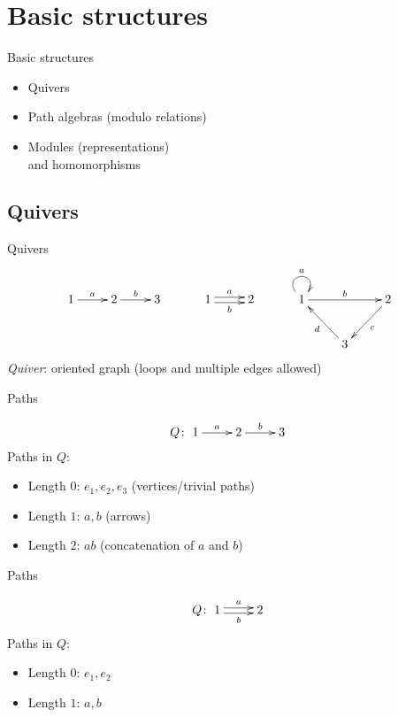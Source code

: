 \documentclass[usenames,dvipsnames]{beamer}
\newcommand{\defn}[1]{\textit{#1}}
\begin{document}
\section{Basic structures}

\begin{frame}{}
\huge Basic structures
\Large
\begin{itemize}
\item Quivers
\item Path algebras (modulo relations)
\item Modules (representations)\\and homomorphisms
\end{itemize}
\end{frame}

\subsection{Quivers}

\begin{frame}{Quivers}
\[
\xymatrix{1\ar[r]^a & 2\ar[r]^b & 3} \qquad\quad
\xymatrix{1\ar@<.5ex>[r]^a\ar@<-.5ex>[r]_b & 2} \qquad\quad
\xymatrix{1\ar@(ul,ur)^a\ar[rr]^b & & 2\ar[dl]^c \\ & 3\ar[ul]^d & }
\]
\pause \defn{Quiver}: oriented graph (loops and multiple edges allowed)
\end{frame}

\begin{frame}{Paths}

{\Large
\[
Q \colon \xymatrix{1\ar[r]^a & 2\ar[r]^b & 3}
\]
}
Paths in $Q$:\pause
\begin{itemize}
\item Length $0$: $e_1, e_2, e_3$ (vertices/trivial paths)
\pause
\item Length $1$: $a, b$ (arrows)
\pause
\item Length $2$: $ab$ (concatenation of $a$ and $b$)
\end{itemize}
\end{frame}

\begin{frame}{Paths}

{\Large
\[
Q \colon \xymatrix{1\ar@<.5ex>[r]^a\ar@<-.5ex>[r]_b & 2}
\]
}
Paths in $Q$:\pause
\begin{itemize}
\item Length $0$: $e_1, e_2$
\pause
\item Length $1$: $a, b$
\end{itemize}
\end{frame}
\end{document}
